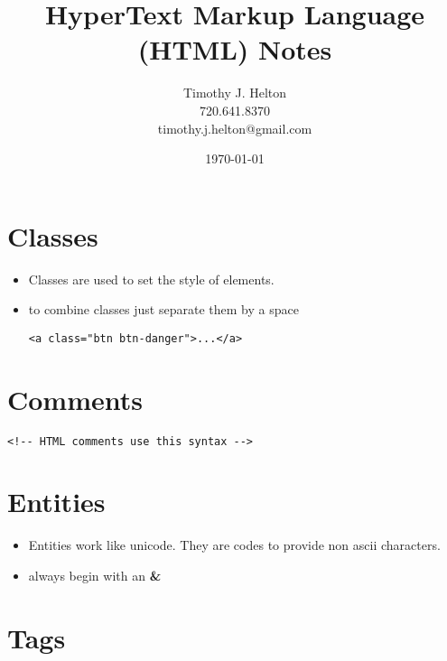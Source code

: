 \documentclass{article}
\newcommand{\mytitle}{HyperText Markup Language (HTML) Notes}
\begin{document}
\author{Timothy J. Helton\\720.641.8370\\timothy.j.helton@gmail.com}
\date{\today}
\title{\mytitle}

\maketitle
\newpage

\tableofcontents
\newpage

\listoffigures
\listoftables
\newpage


\section{Classes}
\begin{itemize}
  \item Classes are used to set the style of elements.
  \item to combine classes just separate them by a space

\begin{lstlisting}
<a class="btn btn-danger">...</a>
\end{lstlisting}

\end{itemize}

\section{Comments}

\begin{lstlisting}
<!-- HTML comments use this syntax -->
\end{lstlisting}

\section{Entities}
\begin{itemize}
  \item Entities work like unicode. They are codes to provide non ascii
        characters.
  \item always begin with an \textbf{\&}
\end{itemize}

\section{Tags}
\end{document}
